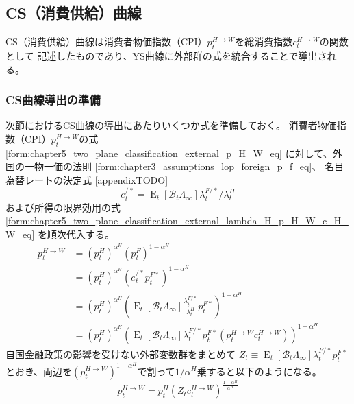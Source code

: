 
\subsection{CS（消費供給）曲線}
\label{sec:chapter5_two_plane_cs}
CS（消費供給）曲線は消費者物価指数（CPI）\(p_t^{H\to W}\)を総消費指数\(c_t^{H\to W}\)の関数として
記述したものであり、YS曲線に外部群の式を統合することで導出される。

\subsubsection{CS曲線導出の準備}
\label{sec:chapter5_two_plane_cs_preparation}
次節におけるCS曲線の導出にあたりいくつか式を準備しておく。
消費者物価指数（CPI）\(p_t^{H\to W}\)の式
\eqref{form:chapter5_two_plane_classification_external_p_H_W_eq}
に対して、外国の一物一価の法則
\eqref{form:chapter3_assumptions_lop_foreign_p_f_eq}、
名目為替レートの決定式
\eqref{appendixTODO}
\begin{equation}
\label{form:chapter5_two_plane_cs_preparation_e_slash_star_eq}
e_t^{/*}=\operatorname{E}_t[\mathcal{B}_t\Lambda_{\infty}]\lambda_t^{F/*}/\lambda_t^H
\end{equation}
および所得の限界効用の式
\eqref{form:chapter5_two_plane_classification_external_lambda_H_p_H_W_c_H_W_eq}
を順次代入する。
\begin{equation}
\label{form:chapter5_two_plane_cs_preparation_p_H_W_eq}
    \begin{aligned}
        p_t^{H\to W}
        &=(p_t^H)^{\alpha^H}(p_t^F)^{1-\alpha^H} \\
        &=(p_t^H)^{\alpha^H}(e_t^{/*}p_t^{F*})^{1-\alpha^H} \\
        &=(p_t^H)^{\alpha^H}\left(\operatorname{E}_t[\mathcal{B}_t\Lambda_{\infty}]\frac{\lambda_t^{F/*}}{\lambda_t^H}p_t^{F*}\right)^{1-\alpha^H} \\
        &=(p_t^H)^{\alpha^H}\left(\operatorname{E}_t[\mathcal{B}_t\Lambda_{\infty}]\lambda_t^{F/*}p_t^{F*}(p_t^{H\to W}c_t^{H\to W})\right)^{1-\alpha^H}
    \end{aligned}
\end{equation}
自国金融政策の影響を受けない外部変数群をまとめて
\(Z_t\equiv\operatorname{E}_t[\mathcal{B}_t\Lambda_{\infty}]\lambda_t^{F/*}p_t^{F*}\)
とおき、両辺を\((p_t^{H\to W})^{1-\alpha^H}\)で割って\(1/\alpha^H\)乗すると以下のようになる。
\begin{equation}
\label{form:chapter5_two_plane_cs_preparation_p_H_W_modified_eq}
    p_t^{H\to W}=p_t^H(Z_tc_t^{H\to W})^{\frac{1-\alpha^H}{\alpha^H}}
\end{equation}

